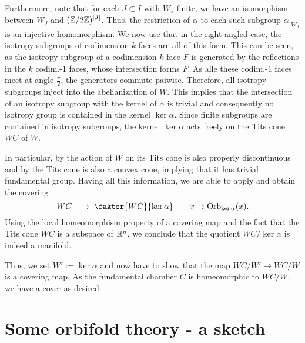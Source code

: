 Furthermore, note that for each \(J \subset I\) with \(W_J\) finite, we have an isomorphism between \(W_J\) and \((\mathbb{Z}/2\mathbb{Z})^{\left\vert J\right\vert}\).
Thus, the restriction of \(\alpha\) to each such subgroup \(\alpha\vert_{W_J}\) is an injcetive homomorphism.
We now use that in the right-angled case, the isotropy subgroups of codimension-\(k\) faces are all of this form.
This can be seen, as the isotropy subgroup of a codimension-\(k\) face \(F\) is generated by the reflections in the \(k\) codim.-\(1\) faces, whose intersection forms \(F\).
As alle these codim.-\(1\) faces meet at angle \(\frac{\pi}{2}\), the generators commute paiwise.
Therefore, all isotropy subgroups inject into the abelianization of \(W\).
This implies that the intersection of an isotropy subgroup with the kernel of \(\alpha\) is trivial and consequently no isotropy group is contained in the kernel \(\ker\alpha\).
Since finite subgroups are contained in isotropy subgroups, the kernel \(\ker\alpha\) acts freely on the Tits cone \(WC\) of \(W\).

In particular, by  the action of \(W\) on its Tits cone is also properly discontinuous and by  the Tits cone is also a convex cone, implying that it has trivial fundamental group.
Having all this information, we are able to apply  and obtain the covering
\[WC \;\longrightarrow\; \faktor{WC}{\ker\alpha} \qquad x \mapsto \text{Orb}_{\ker\alpha}(x).\]
Using the local homeomorphism property of a covering map and the fact that the Tits cone \(WC\) is a subspace of \(\mathbb{R}^n\), we conclude that the quotient \(WC/\ker\alpha\) is indeed a manifold.

Thus, we set \(W' := \ker\alpha\) and now have to show that the map \(WC/W' \to WC/W\) is a covering map.
As the fundamental chamber \(C\) is homeomorphic to \(WC/W\), we have a cover as desired.


\section{Some orbifold theory - a sketch}